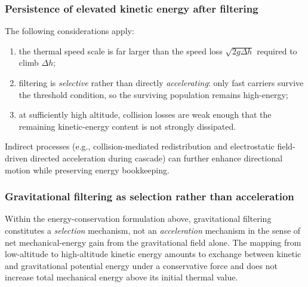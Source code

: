 \documentclass[11pt,a4paper]{article}
\begin{document}
\subsubsection{Persistence of elevated kinetic energy after filtering}
The following considerations apply:
\begin{enumerate}
  \item the thermal speed scale is far larger than the speed loss $\sqrt{2g\Delta h}$ required to climb $\Delta h$;
  \item filtering is \emph{selective} rather than directly \emph{accelerating}: only fast carriers survive the threshold condition, so the surviving population remains high-energy;
  \item at sufficiently high altitude, collision losses are weak enough that the remaining kinetic-energy content is not strongly dissipated.
\end{enumerate}
Indirect processes (e.g., collision-mediated redistribution and electrostatic field-driven directed acceleration during cascade) can further enhance directional motion while preserving energy bookkeeping.

\subsubsection{Gravitational filtering as selection rather than acceleration}
Within the energy-conservation formulation above, gravitational filtering constitutes a \emph{selection} mechanism, not an \emph{acceleration} mechanism in the sense of net mechanical-energy gain from the gravitational field alone. The mapping from low-altitude to high-altitude kinetic energy amounts to exchange between kinetic and gravitational potential energy under a conservative force and does not increase total mechanical energy above its initial thermal value.
\end{document}
